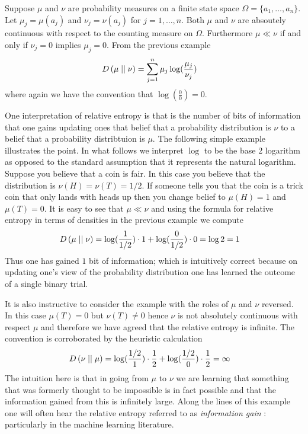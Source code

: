 \begin{examp}\label{RelativeEntropyFiniteSampleSpace}
Suppose $\mu$ and $\nu$ are probability measures on a finite state
space $\Omega = \lbrace a_1, \dotsc, a_n \rbrace$.  Let $\mu_j =
\mu(a_j)$ and $\nu_j = \nu(a_j)$ for $j=1, \dotsc, n$.  Both $\mu$ and
$\nu$ are absoutely continuous with respect to the counting measure on
$\Omega$.  Furthermore $\mu \ll \nu$ if and only if $\nu_j = 0$
implies $\mu_j=0$.  From the previous example  
\begin{align*}
D\left( \mu \mid\mid \nu \right) &= \sum_{j=1}^n \mu_j \log(\frac{\mu_j}{\nu_j}) 
\end{align*}
where again we have the convention that $\log(\frac{0}{0}) = 0$.
\end{examp}

\begin{examp}One interpretation of relative entropy is that is the
  number of bits of information that one gains updating ones that
  belief that a probability distribution is $\nu$ to a belief that a
  probability distribtuion is $\mu$.  The following simple example
  illustrates the point.  In what follows we interpret $\log$ to be
  the base 2 logarithm as opposed to the standard assumption that it
  represents the natural logarithm.  Suppose you believe that a coin is fair.  In
  this case you believe that the distribution is $\nu(H) = \nu(T) =
  1/2$.  If someone tells you that the coin is a trick coin that only
  lands with heads up then you change belief to $\mu(H) = 1$ and
  $\mu(T)=0$.  It is easy to see that $\mu \ll  \nu$ and using the formula for relative entropy in terms of
  densities in the previous example we compute
\begin{align*}
D\left( \mu \mid\mid \nu \right) &= \log(\frac{1}{1/2}) \cdot 1 + \log
(\frac{0}{1/2}) \cdot 0 = \log 2 = 1
\end{align*}
Thus one has gained $1$ bit of information; which is intuitively
correct because on updating one's view of the probability distribution
one has learned the outcome of a single binary trial.

It is also instructive to consider the example with the roles of $\mu$
and $\nu$ reversed.  In this case $\mu(T) = 0$ but $\nu(T) \neq 0$
hence $\nu$ is not absolutely continuous with respect $\mu$ and
therefore we have agreed that the relative entropy is infinite.  The convention
is corroborated by the heuristic calculation
\begin{align*}
D\left( \nu \mid\mid \mu \right) &= \log(\frac{1/2}{1}) \cdot \frac{1}{2} + \log
(\frac{1/2}{0}) \cdot \frac{1}{2} = \infty
\end{align*}
The intuition here is that in going from $\mu$ to $\nu$ we are
learning that something that was formerly thought to be impossible is
in fact possible and that the information gained from this is
infinitely large.  Along the lines of this example one will often hear
the relative entropy referred to as \emph{information gain} :
particularly in the machine learning literature.
\end{examp}

